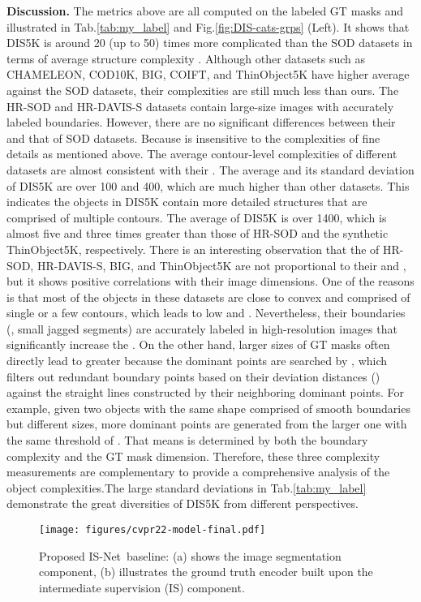 \documentclass[10pt,twocolumn,letterpaper]{article}
\newcommand{\figref}[1]{Fig.\ref{#1}}
\newcommand{\tabref}[1]{Tab.\ref{#1}}
\def\ourmodel{IS-Net}
\begin{document}
\noindent\textbf{Discussion.} The metrics above are all computed on the labeled GT masks and illustrated in \tabref{tab:my_label} and \figref{fig:DIS-cats-grps} (Left). It shows that DIS5K is around 20 (up to 50) times more complicated than the SOD datasets in terms of average structure complexity . Although other datasets such as CHAMELEON, COD10K, BIG, COIFT, and ThinObject5K have higher average  against the SOD datasets, their complexities are still much less than ours. The HR-SOD and HR-DAVIS-S datasets contain large-size images with accurately labeled boundaries. However, there are no significant differences between their  and that of SOD datasets. Because  is insensitive to the complexities of fine details as mentioned above. The average contour-level complexities  of different datasets are almost consistent with their . The average  and its standard deviation of DIS5K are over 100 and 400, which are much higher than other datasets. This indicates the objects in DIS5K contain more detailed structures that are comprised of multiple contours. The average  of DIS5K is over 1400, which is almost five and three times greater than those of HR-SOD and the synthetic ThinObject5K, respectively. There is an interesting observation that the  of HR-SOD, HR-DAVIS-S, BIG, and ThinObject5K are not proportional to their  and , but it shows positive correlations with their image dimensions. One of the reasons is that most of the objects in these datasets are close to convex and comprised of single or a few contours, which leads to low  and .
Nevertheless, their boundaries (\eg, small jagged segments) are accurately labeled in high-resolution images that significantly increase the . 
On the other hand, larger sizes of GT masks often directly lead to greater  because the dominant points are searched by \cite{DBLP:journals/cvgip/Ramer72}, which filters out redundant boundary points based on their deviation distances () against the straight lines constructed by their neighboring dominant points. For example, given two objects with the same shape comprised of smooth boundaries but different sizes, more dominant points are generated from the larger one with the same threshold of . That means  is determined by both the boundary complexity and the GT mask dimension. Therefore, these three complexity measurements are complementary to provide a comprehensive analysis of the object complexities.The large standard deviations in \tabref{tab:my_label} demonstrate the great diversities of DIS5K from different perspectives. 

\begin{figure*}[t!]
    \centering
    \texttt{[image: figures/cvpr22-model-final.pdf]}
    \vspace{-10pt}
    \caption{\small 
    Proposed \ourmodel~baseline: (a) shows the image segmentation component, (b) illustrates the ground truth encoder built upon the intermediate supervision (IS) component.}
    \label{fig:model}
    \vspace{-10pt}
\end{figure*}
\end{document}
